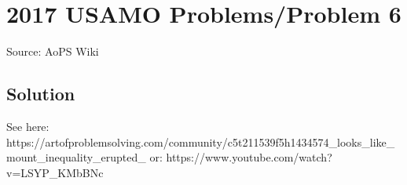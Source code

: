 \documentclass[12pt]{article}
\begin{document}
\section*{{2017 USAMO Problems/Problem 6}}
Source: AoPS Wiki

\subsection*{Solution}
See here: https://artofproblemsolving.com/community/c5t211539f5h1434574_looks_like_mount_inequality_erupted_ or: https://www.youtube.com/watch?v=LSYP_KMbBNc
\end{document}
